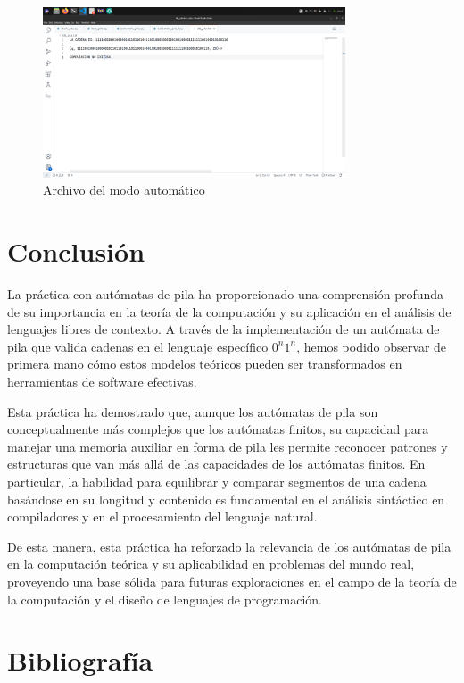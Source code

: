 \documentclass[11pt]{article} %
\begin{document}
	\begin{figure}[h]
		\centering
		\includegraphics[width=0.8\textwidth]{arch2}
		\caption{Archivo del modo automático}
	\end{figure}
	
	\newpage
	\section*{Conclusión}
	La práctica con autómatas de pila ha proporcionado una comprensión profunda de su importancia en la teoría de la computación y su aplicación en el análisis de lenguajes libres de contexto. A través de la implementación de un autómata de pila que valida cadenas en el lenguaje específico $0^n1^n$, hemos podido observar de primera mano cómo estos modelos teóricos pueden ser transformados en herramientas de software efectivas.
	
	Esta práctica ha demostrado que, aunque los autómatas de pila son conceptualmente más complejos que los autómatas finitos, su capacidad para manejar una memoria auxiliar en forma de pila les permite reconocer patrones y estructuras que van más allá de las capacidades de los autómatas finitos. En particular, la habilidad para equilibrar y comparar segmentos de una cadena basándose en su longitud y contenido es fundamental en el análisis sintáctico en compiladores y en el procesamiento del lenguaje natural.
	
	
	De esta manera, esta práctica ha reforzado la relevancia de los autómatas de pila en la computación teórica y su aplicabilidad en problemas del mundo real, proveyendo una base sólida para futuras exploraciones en el campo de la teoría de la computación y el diseño de lenguajes de programación.
	
	\section*{Bibliografía}
	
\end{document}
